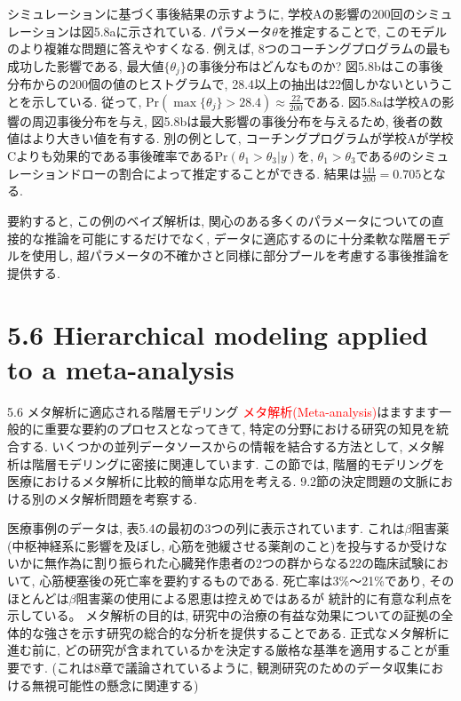 \documentclass[10pt,dvipdfmx,a4]{beamer}
\newcommand{\tcr}[1]{\textcolor{red}{#1}}
\begin{document}

\begin{frame}
シミュレーションに基づく事後結果の示すように, 学校Aの影響の200回のシミュレーションは図5.8aに示されている.
パラメータ$\theta$を推定することで, このモデルのより複雑な問題に答えやすくなる.
例えば, 8つのコーチングプログラムの最も成功した影響である, 最大値$\{\theta_j\}$の事後分布はどんなものか?
図5.8bはこの事後分布からの200個の値のヒストグラムで, 28.4以上の抽出は22個しかないということを示している.
従って, $\text{Pr}(\max\{\theta_j\}>28.4)\approx  \tfrac{22}{200}$である.
図5.8aは学校Aの影響の周辺事後分布を与え, 図5.8bは最大影響の事後分布を与えるため, 後者の数値はより大きい値を有する.
別の例として, コーチングプログラムが学校Aが学校Cよりも効果的である事後確率である$\text{Pr}(\theta_1>\theta_3|y)$を, $\theta_1>\theta_3$である$\theta$のシミュレーションドローの割合によって推定することができる.
結果は$\tfrac{141}{200}=0.705$となる.

要約すると, この例のベイズ解析は, 関心のある多くのパラメータについての直接的な推論を可能にするだけでなく, データに適応するのに十分柔軟な階層モデルを使用し, 超パラメータの不確かさと同様に部分プールを考慮する事後推論を提供する.
\end{frame}

\section{5.6 Hierarchical modeling applied to a meta-analysis}
\begin{frame}{5.6 メタ解析に適応される階層モデリング}
\tcr{メタ解析(Meta-analysis)}はますます一般的に重要な要約のプロセスとなってきて, 特定の分野における研究の知見を統合する.
いくつかの並列データソースからの情報を結合する方法として, メタ解析は階層モデリングに密接に関連しています.
この節では, 階層的モデリングを医療におけるメタ解析に比較的簡単な応用を考える.
9.2節の決定問題の文脈における別のメタ解析問題を考察する.

医療事例のデータは, 表5.4の最初の3つの列に表示されています.
これは$\beta$阻害薬(中枢神経系に影響を及ぼし, 心筋を弛緩させる薬剤のこと)を投与するか受けないかに無作為に割り振られた心臓発作患者の2つの群からなる22の臨床試験において, 心筋梗塞後の死亡率を要約するものである.
死亡率は3\%～21\%であり, そのほとんどは$\beta$阻害薬の使用による恩恵は控えめではあるが 統計的に有意な利点を示している。
メタ解析の目的は, 研究中の治療の有益な効果についての証拠の全体的な強さを示す研究の総合的な分析を提供することである.
正式なメタ解析に進む前に, どの研究が含まれているかを決定する厳格な基準を適用することが重要です.
(これは8章で議論されているように, 観測研究のためのデータ収集における無視可能性の懸念に関連する)
\end{frame}
\end{document}
